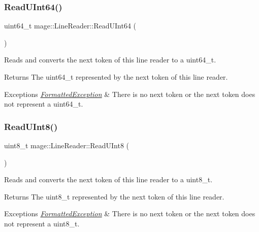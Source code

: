 \subsubsection{\texorpdfstring{Read\+U\+Int64()}{ReadUInt64()}}
{\footnotesize\ttfamily uint64\+\_\+t mage\+::\+Line\+Reader\+::\+Read\+U\+Int64 (\begin{DoxyParamCaption}{ }\end{DoxyParamCaption})\hspace{0.3cm}{\ttfamily [protected]}}

Reads and converts the next token of this line reader to a {\ttfamily uint64\+\_\+t}.

\begin{DoxyReturn}{Returns}
The {\ttfamily uint64\+\_\+t} represented by the next token of this line reader. 
\end{DoxyReturn}

\begin{DoxyExceptions}{Exceptions}
{\em \hyperlink{structmage_1_1_formatted_exception}{Formatted\+Exception}} & There is no next token or the next token does not represent a {\ttfamily uint64\+\_\+t}. \\
\hline
\end{DoxyExceptions}
\hypertarget{classmage_1_1_line_reader_a943ce0074c0861109f8b4ee10df8a221}{}\label{classmage_1_1_line_reader_a943ce0074c0861109f8b4ee10df8a221} 
\subsubsection{\texorpdfstring{Read\+U\+Int8()}{ReadUInt8()}}
{\footnotesize\ttfamily uint8\+\_\+t mage\+::\+Line\+Reader\+::\+Read\+U\+Int8 (\begin{DoxyParamCaption}{ }\end{DoxyParamCaption})\hspace{0.3cm}{\ttfamily [protected]}}

Reads and converts the next token of this line reader to a {\ttfamily uint8\+\_\+t}.

\begin{DoxyReturn}{Returns}
The {\ttfamily uint8\+\_\+t} represented by the next token of this line reader. 
\end{DoxyReturn}

\begin{DoxyExceptions}{Exceptions}
{\em \hyperlink{structmage_1_1_formatted_exception}{Formatted\+Exception}} & There is no next token or the next token does not represent a {\ttfamily uint8\+\_\+t}. \\
\hline
\end{DoxyExceptions}


